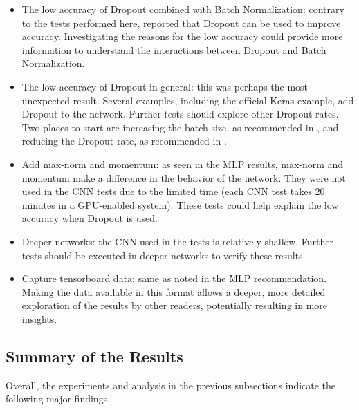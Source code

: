\documentclass[../dropout-vs-batch-normalization.tex]{subfiles}
\begin{document}
\begin{itemize}
\item The low accuracy of Dropout combined with Batch Normalization: contrary to the tests performed here, \cite{Li2018} reported that Dropout can be used to improve accuracy. Investigating the reasons for the low accuracy could provide more information to understand the interactions between Dropout and Batch Normalization.
\item The low accuracy of Dropout in general: this was perhaps the most unexpected result. Several examples, including the official Keras example, add Dropout to the network. Further tests should explore other Dropout rates. Two places to start are increasing the batch size, as recommended in \cite{Luo2018}, and reducing the Dropout rate, as recommended in \cite{Li2018}.
\item Add max-norm and momentum: as seen in the MLP results, max-norm and momentum make a difference in the behavior of the network. They were not used in the CNN tests due to the limited time (each CNN test takes 20 minutes in a GPU-enabled system). These tests could help explain the low accuracy when Dropout is used.
\item Deeper networks: the CNN used in the tests is relatively shallow. Further tests should be executed in deeper networks to verify these results.
\item Capture \href{https://www.tensorflow.org/guide/summaries_and_tensorboard}{tensorboard} data: same as noted in the MLP recommendation. Making the data available in this format allows a deeper, more detailed exploration of the results by other readers, potentially resulting in more insights.
\end{itemize}


\subsection{Summary of the Results}

Overall, the experiments and analysis in the previous subsections indicate the following major findings. 
\end{document}
